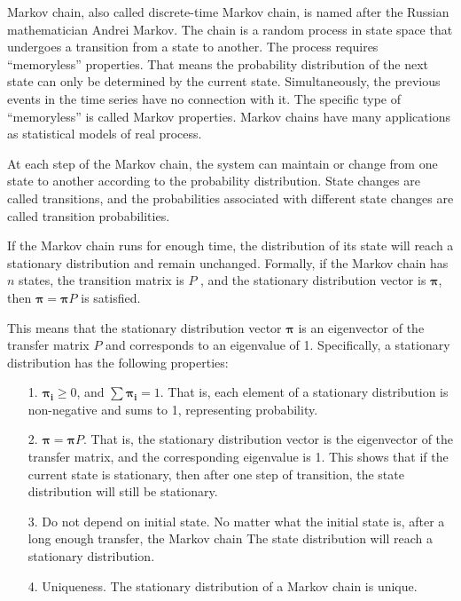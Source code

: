 \documentclass[lettersize,journal,12pt]{IEEEtran}
\begin{document}
Markov chain, also called discrete-time Markov chain, is named after the Russian mathematician Andrei Markov. The chain is a random process in state space that undergoes a transition from a state to another. The process requires ``memoryless'' properties. That means the probability distribution of the next state can only be determined by the current state. Simultaneously, the previous events in the time series have no connection with it. The specific type of ``memoryless'' is called Markov properties. Markov chains have many applications as statistical models of real process.

At each step of the Markov chain, the system can maintain or change from one state to another according to the probability distribution. State changes are called transitions, and the probabilities associated with different state changes are called transition probabilities.

If the Markov chain runs for enough time, the distribution of its state will reach a stationary distribution and remain unchanged. Formally, if the Markov chain has $n$ states, the transition matrix is $P$
, and the stationary distribution vector is $\boldsymbol{\pi}$, then $\boldsymbol{\pi} = \boldsymbol{\pi} P$ is satisfied.

This means that the stationary distribution vector $\boldsymbol{\pi}$ is an eigenvector of the transfer matrix $P$ and corresponds to an eigenvalue of 1. Specifically, a stationary distribution has the following properties:
\begin{enumerate}
	\item [1.] $\boldsymbol{\pi_i}\geq0$, and $\sum\boldsymbol{\pi_i}=1$. That is, each element of a stationary distribution is non-negative and sums to 1, representing probability.
	\item [2.] $\boldsymbol{\pi} = \boldsymbol{\pi} P$. That is, the stationary distribution vector is the eigenvector of the transfer matrix, and the corresponding eigenvalue is 1. This shows that if the current state is stationary, then after one step of transition, the state distribution will still be stationary.
	\item [3.] Do not depend on initial state. No matter what the initial state is, after a long enough transfer, the Markov chain
	      The state distribution will reach a stationary distribution.
	\item [4.] Uniqueness. The stationary distribution of a Markov chain is unique.
\end{enumerate}
\end{document}
